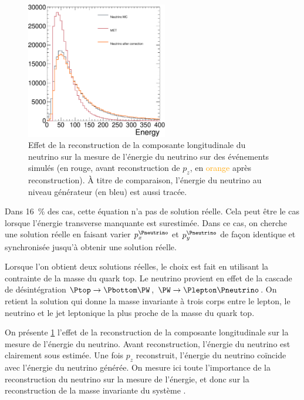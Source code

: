 \begin{figure}[tbp]
    \centering
    \includegraphics[width=0.55\textwidth]{chapitre6/figs/neutrino_energy/plot_met_energy.pdf}
    \caption{Effet de la reconstruction de la composante longitudinale du neutrino sur la mesure de l'énergie du neutrino sur des événements \ttbar simulés (en \textcolor{rouge_grandmere}{rouge}, avant reconstruction de $p_z$, en \textcolor{orange}{orange} après reconstruction). À titre de comparaison, l'énergie du neutrino au niveau générateur (en \textcolor{bleu_gris}{bleu}) est aussi tracée.}
    \label{fig:neutrino_correction}
\end{figure}

Dans \tilde\SI{16}{\%} des cas, cette équation n'a pas de solution réelle. Cela peut être le cas lorsque l'énergie transverse manquante est surestimée. Dans ce cas, on cherche une solution réelle en faisant varier $p_x^{\Pneutrino}$ et $p_y^{\Pneutrino}$ de façon identique et synchronisée jusqu'à obtenir une solution réelle.

Lorsque l'on obtient deux solutions réelles, le choix est fait en utilisant la contrainte de la masse du quark top. Le neutrino provient en effet de la cascade de désintégration $\Ptop \rightarrow \Pbottom \PW$, $\PW \rightarrow \Plepton \Pneutrino$. On retient la solution qui donne la masse invariante à trois corps entre le lepton, le neutrino et le jet \Pbottom leptonique la plus proche de la masse du quark top.

\medskip

On présente \cref{fig:neutrino_correction} l'effet de la reconstruction de la composante longitudinale sur la mesure de l'énergie du neutrino. Avant reconstruction, l'énergie du neutrino est clairement sous estimée. Une fois $p_z$ reconstruit, l'énergie du neutrino coïncide avec l'énergie du neutrino générée. On mesure ici toute l'importance de la reconstruction du neutrino sur la mesure de l'énergie, et donc sur la reconstruction de la masse invariante du système \ttbar.

